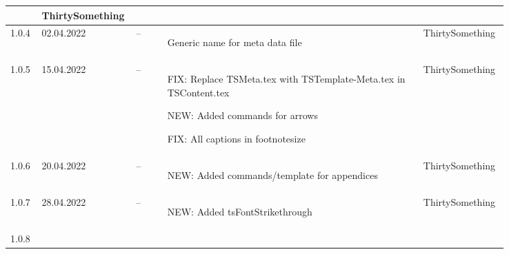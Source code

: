 \begin{tiny}
\begin{longtable}{ | p{0.06\linewidth} | p{0.08\linewidth} | p{0.06\linewidth} | P{0.49\linewidth} | p{0.15\linewidth} | }
                                 &
        ThirtySomething            \\
        \hline
        1.0.4                    &
        02.04.2022               &
        --                       &
        \begin{tsLTItemize}
            \item Generic name for meta data file
        \end{tsLTItemize}
                                 &
        ThirtySomething            \\
        \hline
        1.0.5                    &
        15.04.2022               &
        --                       &
        \begin{tsLTItemize}
            \item FIX: Replace TSMeta.tex with TSTemplate-Meta.tex in TSContent.tex
            \item NEW: Added commands for arrows
            \item FIX: All captions in footnotesize
        \end{tsLTItemize}
                                 &
        ThirtySomething            \\
        \hline
        1.0.6                    &
        20.04.2022               &
        --                       &
        \begin{tsLTItemize}
            \item NEW: Added commands/template for appendices
        \end{tsLTItemize}
                                 &
        ThirtySomething            \\
        \hline
        1.0.7                    &
        28.04.2022               &
        --                       &
        \begin{tsLTItemize}
            \item NEW: Added tsFontStrikethrough
        \end{tsLTItemize}
                                 &
        ThirtySomething            \\
        \hline
        1.0.8                    &

\end{longtable}
\end{tiny}
